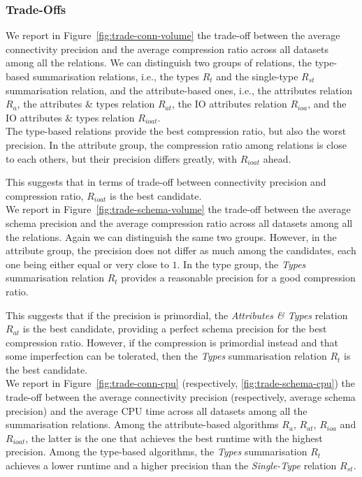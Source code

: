 \subsubsection{Trade-Offs}

We report in Figure~\ref{fig:trade-conn-volume} the trade-off between the average connectivity precision and the average compression ratio across all datasets among all the relations. We can distinguish two groups of relations, the type-based summarisation relations, i.e., the types $R_t$ and the single-type $R_{st}$ summarisation relation, and the attribute-based ones, i.e., the attributes relation $R_a$, the attributes \& types relation $R_{at}$, the IO attributes relation $R_{ioa}$, and the IO attributes \& types relation $R_{ioat}$.\\

The type-based relations provide the best compression ratio, but also the worst precision. In the attribute group, the compression ratio among relations is close to each others, but their precision differs greatly, with $R_{ioat}$ ahead.

This suggests that in terms of trade-off between connectivity precision and compression ratio, $R_{ioat}$ is the best candidate.\\

We report in Figure~\ref{fig:trade-schema-volume} the trade-off between the average schema precision and the average compression ratio across all datasets among all the relations. Again we can distinguish the same two groups. However, in the attribute group, the precision does not differ as much among the candidates, each one being either equal or very close to $1$. In the type group, the \emph{Types} summarisation relation $R_t$ provides a reasonable precision for a good compression ratio.

This suggests that if the precision is primordial, the \emph{Attributes \& Types} relation $R_{at}$ is the best candidate, providing a perfect schema precision for the best compression ratio. However, if the compression is primordial instead and that some imperfection can be tolerated, then the \emph{Types} summarisation relation $R_t$ is the best candidate.\\

We report in Figure~\ref{fig:trade-conn-cpu} (respectively, \ref{fig:trade-schema-cpu}) the trade-off between the average connectivity precision (respectively, average schema precision) and the average CPU time across all datasets among all the summarisation relations. Among the attribute-based algorithms $R_a$, $R_{at}$, $R_{ioa}$ and $R_{ioat}$, the latter is the one that achieves the best runtime with the highest precision. Among the type-based algorithms, the \emph{Types} summarisation $R_t$ achieves a lower runtime and a higher precision than the \emph{Single-Type} relation $R_{st}$.

